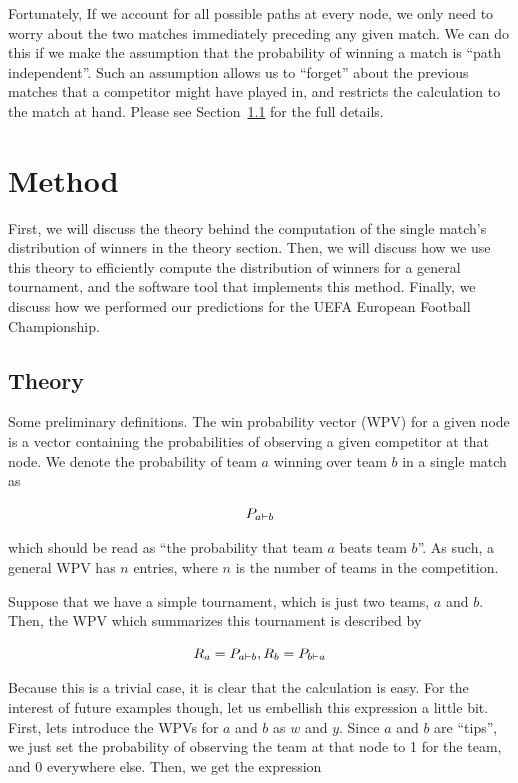 \documentclass{article}
\begin{document}
Fortunately, If we account for all possible paths at every node, we only need to worry about the two matches immediately
preceding any given match. We can do this if we make the assumption that the probability of winning a match is ``path
independent''. Such an assumption allows us to ``forget'' about the previous matches that a competitor might have played
in, and restricts the calculation to the match at hand. Please see Section~\ref{sec:theory} for the full details.

\section{Method}

First, we will discuss the theory behind the computation of the single match's distribution of winners in the theory
section. Then, we will discuss how we use this theory to efficiently compute the distribution of winners for a general
tournament, and the software tool that implements this method. Finally, we discuss how we performed our predictions for
the UEFA European Football Championship.

\subsection{Theory}\label{sec:theory}

Some preliminary definitions. The win probability vector (WPV) for a given node is a vector containing the probabilities
of observing a given competitor at that node. We denote the probability of team $a$ winning over team $b$ in a single
match as 

\begin{equation*}
P_{a \vdash b}
\end{equation*}

which should be read as ``the probability that team $a$ beats team $b$''. As such, a general WPV has $n$ entries, where
$n$ is the number of teams in the competition.

Suppose that we have a simple tournament, which is just two teams, $a$ and $b$. Then, the WPV which summarizes this
tournament is described by 

\begin{equation}
R_a = P_{a \vdash b}, R_b = P_{b \vdash a}
\label{eq:base}
\end{equation}

Because this is a trivial case, it is clear that the calculation is easy. For the interest of future examples though,
let us embellish this expression a little bit. First, lets introduce the WPVs for $a$ and $b$ as $w$ and $y$. Since $a$
and $b$ are ``tips'', we just set the probability of observing the team at that node to 1 for the team, and 0 everywhere
else. Then, we get the expression
\end{document}
